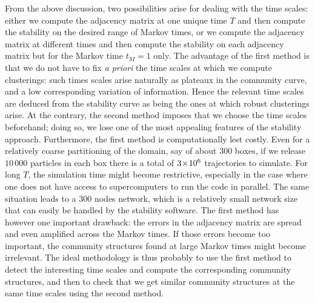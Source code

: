 From the above discussion, two possibilities arise for dealing with the time scales: either we compute the adjacency matrix at one unique time $T$ and then compute the stability on the desired range of Markov times, or we compute the adjacency matrix at different times and then compute the stability on each adjacency matrix but for the Markov time $t_M = 1$ only. The advantage of the first method is that we do not have to fix \textit{a priori} the time scales at which we compute clusterings: such times scales arise naturally as plateaux in the community curve, and a low corresponding variation of information. Hence the relevant time scales are deduced from the stability curve as being the ones at which robust clusterings arise. At the contrary, the second method imposes that we choose the time scales beforehand; doing so, we lose one of the most appealing features of the stability approach. Furthermore, the first method is computationally lest costly. Even for a relatively coarse partitioning of the domain, say of about $300$ boxes, if we release $10\,000$ particles in each box there is a total of $3\!\times\!10^{6}$ trajectories to simulate. For long $T$, the simulation time might become restrictive, especially in the case where one does not have access to supercomputers to run the code in parallel. The same situation leads to a $300$ nodes network, which is a relatively small network size that can easily be handled by the stability software. The first method has however one important drawback: the errors in the adjacency matrix are spread and even amplified across the Markov times. If those errors become too important, the community structures found at large Markov times might become irrelevant. The ideal methodology is thus probably to use the first method to detect the interesting time scales and compute the corresponding community structures, and then to check that we get similar community structures at the same time scales using the second method.

